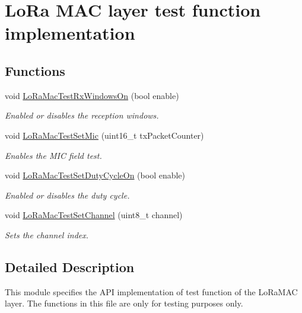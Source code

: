 \hypertarget{group__LORAMACTEST}{}\section{Lo\+Ra M\+AC layer test function implementation}
\label{group__LORAMACTEST}
\subsection*{Functions}
\begin{DoxyCompactItemize}
\item 
void \hyperlink{group__LORAMACTEST_ga3e8dc79232b2c86d12d8b4191324283d}{Lo\+Ra\+Mac\+Test\+Rx\+Windows\+On} (bool enable)
\begin{DoxyCompactList}\small\item\em Enabled or disables the reception windows. \end{DoxyCompactList}\item 
void \hyperlink{group__LORAMACTEST_ga191314e00a8a27f426427473ba6821a7}{Lo\+Ra\+Mac\+Test\+Set\+Mic} (uint16\+\_\+t tx\+Packet\+Counter)
\begin{DoxyCompactList}\small\item\em Enables the M\+IC field test. \end{DoxyCompactList}\item 
void \hyperlink{group__LORAMACTEST_gacee5e0492e548af9e1ec5a995e460865}{Lo\+Ra\+Mac\+Test\+Set\+Duty\+Cycle\+On} (bool enable)
\begin{DoxyCompactList}\small\item\em Enabled or disables the duty cycle. \end{DoxyCompactList}\item 
void \hyperlink{group__LORAMACTEST_ga8cf3cc21ea237c5620536cea2750463e}{Lo\+Ra\+Mac\+Test\+Set\+Channel} (uint8\+\_\+t channel)
\begin{DoxyCompactList}\small\item\em Sets the channel index. \end{DoxyCompactList}\end{DoxyCompactItemize}


\subsection{Detailed Description}
This module specifies the A\+PI implementation of test function of the Lo\+Ra\+M\+AC layer. The functions in this file are only for testing purposes only. 

